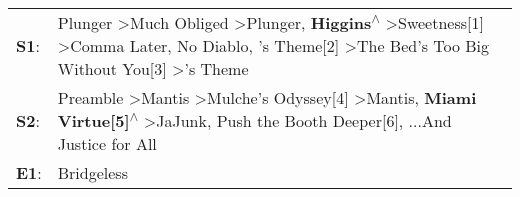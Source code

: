 \begin{supertabular}{p{0.03\textwidth}p{0.92\textwidth}}
 \textbf{S1}:  &  Plunger\textsuperscript{} \textgreater \enspace Much Obliged\textsuperscript{} \textgreater \enspace Plunger\textsuperscript{}, \enspace \textbf{Higgins\textsuperscript{$\wedge$}} \textgreater \enspace Sweetness[1]\textsuperscript{} \textgreater \enspace Comma Later\textsuperscript{}, \enspace No Diablo\textsuperscript{}, 's Theme[2]\textsuperscript{} \textgreater \enspace The Bed's Too Big Without You[3]\textsuperscript{} \textgreater {}'s Theme\textsuperscript{}  \enspace  \\
 \textbf{S2}:  &                                                                                                  Preamble\textsuperscript{} \textgreater \enspace Mantis\textsuperscript{} \textgreater \enspace Mulche's Odyssey[4]\textsuperscript{} \textgreater \enspace Mantis\textsuperscript{}, \enspace \textbf{Miami Virtue[5]\textsuperscript{$\wedge$}} \textgreater \enspace JaJunk\textsuperscript{}, \enspace Push the Booth Deeper[6]\textsuperscript{}, \enspace ...And Justice for All\textsuperscript{}  \enspace  \\
 \textbf{E1}:  &                                                                                                                                                                                                                                                                                                                                                                                                                                                                              Bridgeless\textsuperscript{}  \enspace  \\
\end{supertabular}

